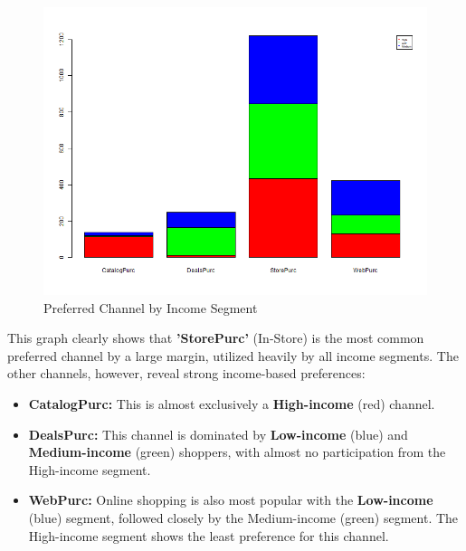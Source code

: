 \begin{figure}[H]
    \centering
    \includegraphics[width= 1\linewidth]{Imatges/stacked_barplot_counts_IncomeSegment_10_legend(channel).png}
    \caption{Preferred Channel by Income Segment}
    \label{fig:scree_plot_10} %
\end{figure}

This graph clearly shows that \textbf{'StorePurc'} (In-Store) is the most common preferred channel by a large margin, utilized heavily by all income segments. The other channels, however, reveal strong income-based preferences:
\begin{itemize}
    \item \textbf{CatalogPurc:} This is almost exclusively a \textbf{High-income} (red) channel.
    \item \textbf{DealsPurc:} This channel is dominated by \textbf{Low-income} (blue) and \textbf{Medium-income} (green) shoppers, with almost no participation from the High-income segment.
    \item \textbf{WebPurc:} Online shopping is also most popular with the \textbf{Low-income} (blue) segment, followed closely by the Medium-income (green) segment. The High-income segment shows the least preference for this channel.
\end{itemize}

\newpage
